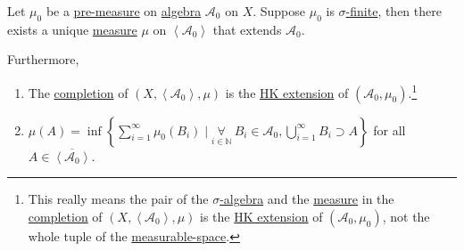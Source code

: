 \begin{corollary}\label{col:lec-6}
	Let \(\mu _0\) be a \hyperref[def:pre-measure]{pre-measure} on \hyperref[def:algebra]{algebra} \(\mathcal{A} _0\) on \(X\). Suppose \(\mu _0\) is
	\hyperref[def:finite-measure]{\(\sigma \)-finite}, then there exists a unique \hyperref[def:measure]{measure} \(\mu\) on \(\left< \mathcal{A} _0 \right> \)
	that extends \(\mathcal{A} _0\).

	Furthermore,
	\begin{enumerate}[(1)]
		\item The \hyperref[def:complete-measure-space]{completion} of \((X, \left< \mathcal{A} _0 \right>, \mu  )\) is the \hyperref[def:HK-extension]{HK extension} of
		      \((\mathcal{A} _0, \mu _0)\).\footnote{This really means the pair of the \hyperref[def:sigma-algebra]{\(\sigma\)-algebra} and the \hyperref[def:measure]{measure} in
			      the \hyperref[def:complete]{completion} of \((X, \left< \mathcal{A} _0 \right>, \mu  )\) is the \hyperref[def:HK-extension]{HK extension} of \((\mathcal{A} _0, \mu _0)\),
			      not the whole tuple of the \hyperref[def:measurable-space]{measurable-space}.}
		\item \(\mu (A) = \inf\left\{\sum_{i=1}^{\infty} \mu _0(B_{i})\mid \underset{i\in\mathbb{N} }{\forall}\ B_{i}\in \mathcal{A} _0, \bigcup_{i=1}^{\infty} B_{i}\supset A\right\}\)
		      for all \(A\in \overline{\left< \mathcal{A} _0 \right> }\).
	\end{enumerate}
\end{corollary}